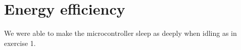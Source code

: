 \section{Energy efficiency}

We were able to make the microcontroller sleep as deeply when idling as in exercise 1.
